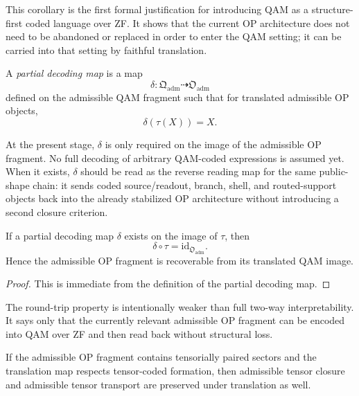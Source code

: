 \begin{remark}
This corollary is the first formal justification for introducing QAM as a structure-first coded language over ZF. It shows that the current OP architecture does not need to be abandoned or replaced in order to enter the QAM setting; it can be carried into that setting by faithful translation.
\end{remark}

\begin{definition}
\label{def:partial-decoding-map}
A \emph{partial decoding map} is a map
\[
\delta:\mathfrak{Q}_{\mathrm{adm}}\dashrightarrow \mathfrak{O}_{\mathrm{adm}}
\]
defined on the admissible QAM fragment such that for translated admissible OP objects,
\[
\delta(\tau(X))=X.
\]
\end{definition}

\begin{remark}
At the present stage, $\delta$ is only required on the image of the admissible OP fragment. No full decoding of arbitrary QAM-coded expressions is assumed yet. When it exists, $\delta$ should be read as the reverse reading map for the same public-shape chain: it sends coded source/readout, branch, shell, and routed-support objects back into the already stabilized OP architecture without introducing a second closure criterion.
\end{remark}

\begin{proposition}\label{prop:round-trip-property-admissible-fragment}
If a partial decoding map $\delta$ exists on the image of $\tau$, then
\[
\delta\circ\tau = \mathrm{id}_{\mathfrak{O}_{\mathrm{adm}}}.
\]
Hence the admissible OP fragment is recoverable from its translated QAM image.
\end{proposition}

\begin{proof}
This is immediate from the definition of the partial decoding map.
\end{proof}

\begin{remark}
The round-trip property is intentionally weaker than full two-way interpretability. It says only that the currently relevant admissible OP fragment can be encoded into QAM over ZF and then read back without structural loss.
\end{remark}

\begin{corollary}
If the admissible OP fragment contains tensorially paired sectors and the translation map respects tensor-coded formation, then admissible tensor closure and admissible tensor transport are preserved under translation as well.
\end{corollary}

